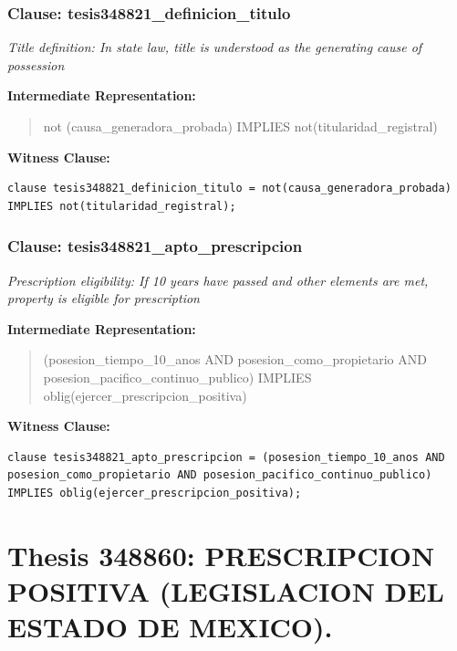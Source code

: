 \documentclass[11pt,a4paper]{article}
\begin{document}
\subsubsection{Clause: tesis348821\_definicion\_titulo}

\textit{Title definition: In state law, title is understood as the generating cause of possession}

\textbf{Intermediate Representation:}

\begin{quote}
not (causa\_generadora\_probada) IMPLIES not(titularidad\_registral)
\end{quote}

\textbf{Witness Clause:}

\begin{lstlisting}[style=witnessstyle, language=Witness]
clause tesis348821_definicion_titulo = not(causa_generadora_probada) IMPLIES not(titularidad_registral);
\end{lstlisting}

\subsubsection{Clause: tesis348821\_apto\_prescripcion}

\textit{Prescription eligibility: If 10 years have passed and other elements are met, property is eligible for prescription}

\textbf{Intermediate Representation:}

\begin{quote}
(posesion\_tiempo\_10\_anos AND posesion\_como\_propietario AND posesion\_pacifico\_continuo\_publico) IMPLIES oblig(ejercer\_prescripcion\_positiva)
\end{quote}

\textbf{Witness Clause:}

\begin{lstlisting}[style=witnessstyle, language=Witness]
clause tesis348821_apto_prescripcion = (posesion_tiempo_10_anos AND posesion_como_propietario AND posesion_pacifico_continuo_publico) IMPLIES oblig(ejercer_prescripcion_positiva);
\end{lstlisting}

\newpage

\section{Thesis 348860: PRESCRIPCION POSITIVA (LEGISLACION DEL ESTADO DE MEXICO).}
\label{thesis:348860}
\end{document}
